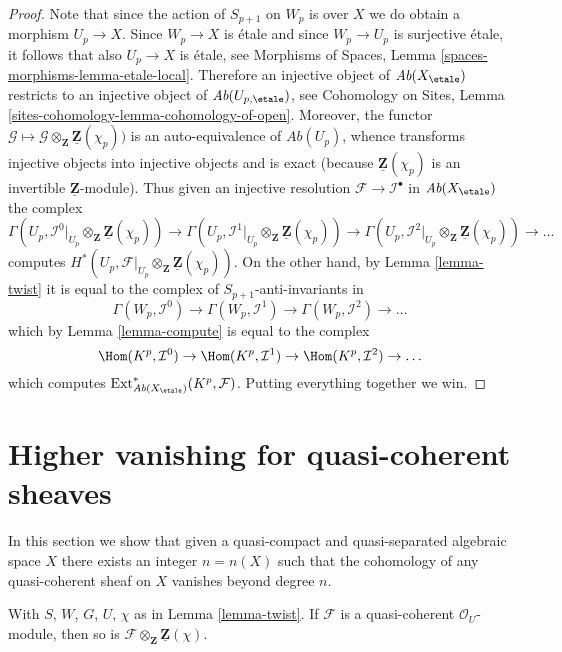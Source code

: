\begin{proof}
Note that since the action of $S_{p + 1}$ on $W_p$ is over $X$ we do
obtain a morphism $U_p \to X$. Since $W_p \to X$ is \'etale and since
$W_p \to U_p$ is surjective \'etale, it follows
that also $U_p \to X$ is \'etale, see
Morphisms of Spaces, Lemma \ref{spaces-morphisms-lemma-etale-local}.
Therefore an injective object of
$\textit{Ab}(X_\etale)$ restricts to an injective object of
$\textit{Ab}(U_{p, \etale})$, see
Cohomology on Sites, Lemma \ref{sites-cohomology-lemma-cohomology-of-open}.
Moreover, the functor
$\mathcal{G} \mapsto
\mathcal{G} \otimes_\mathbf{Z} \underline{\mathbf{Z}}(\chi_p))$
is an auto-equivalence of $\textit{Ab}(U_p)$, whence transforms injective
objects into injective objects and is exact (because
$\underline{\mathbf{Z}}(\chi_p)$ is an invertible
$\underline{\mathbf{Z}}$-module). Thus given an injective resolution
$\mathcal{F} \to \mathcal{I}^\bullet$ in $\textit{Ab}(X_\etale)$
the complex
$$
\Gamma(U_p,
\mathcal{I}^0|_{U_p} \otimes_\mathbf{Z} \underline{\mathbf{Z}}(\chi_p))
\to
\Gamma(U_p,
\mathcal{I}^1|_{U_p} \otimes_\mathbf{Z} \underline{\mathbf{Z}}(\chi_p))
\to
\Gamma(U_p,
\mathcal{I}^2|_{U_p} \otimes_\mathbf{Z} \underline{\mathbf{Z}}(\chi_p))
\to \ldots
$$
computes
$H^*(U_p,
\mathcal{F}|_{U_p} \otimes_\mathbf{Z} \underline{\mathbf{Z}}(\chi_p))$.
On the other hand, by
Lemma \ref{lemma-twist}
it is equal to the complex of $S_{p + 1}$-anti-invariants in
$$
\Gamma(W_p, \mathcal{I}^0) \to
\Gamma(W_p, \mathcal{I}^1) \to
\Gamma(W_p, \mathcal{I}^2) \to \ldots
$$
which by
Lemma \ref{lemma-compute}
is equal to the complex
$$
\Hom(K^p, \mathcal{I}^0) \to
\Hom(K^p, \mathcal{I}^1) \to
\Hom(K^p, \mathcal{I}^2) \to \ldots
$$
which computes
$\text{Ext}^*_{\textit{Ab}(X_\etale)}(K^p, \mathcal{F})$.
Putting everything together we win.
\end{proof}





\section{Higher vanishing for quasi-coherent sheaves}
\label{section-higher-vanishing}

\noindent
In this section we show that given a quasi-compact and
quasi-separated algebraic space $X$ there exists an integer
$n = n(X)$ such that the cohomology of any quasi-coherent
sheaf on $X$ vanishes beyond degree $n$.

\begin{lemma}
\label{lemma-quasi-coherent-twist}
With $S$, $W$, $G$, $U$, $\chi$ as in
Lemma \ref{lemma-twist}.
If $\mathcal{F}$ is a quasi-coherent $\mathcal{O}_U$-module,
then so is $\mathcal{F} \otimes_{\mathbf{Z}} \underline{\mathbf{Z}}(\chi)$.
\end{lemma}

